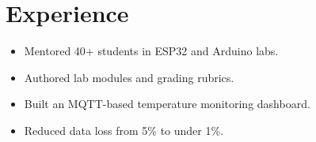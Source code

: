 \section{Experience}
\begin{itemize}
  \item Mentored 40+ students in ESP32 and Arduino labs.
  \item Authored lab modules and grading rubrics.
\end{itemize}
\begin{itemize}
  \item Built an MQTT-based temperature monitoring dashboard.
  \item Reduced data loss from 5\% to under 1\%.
\end{itemize}
